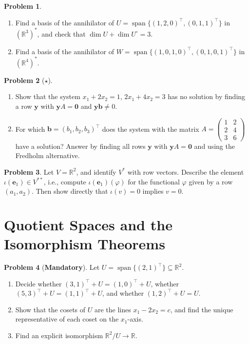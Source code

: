 \documentclass[11pt]{article}
\theoremstyle{definition}
\newtheorem{problem}{Problem}[section]
\newcommand{\mandatory}{\textcolor{red!70!black}{\textbf{Mandatory}}}
\DeclareMathOperator{\Span}{span}
\begin{document}
\begin{problem}\label{pr:annihilator}
    \begin{enumerate}[label=(\alph*)]
        \item Find a basis of the annihilator of $U = \Span\{(1, 2, 0)^\top, (0, 1, 1)^\top\}$ in $(\mathbb{R}^3)^*$, and check that $\dim U + \dim U^\circ = 3$.
        \item Find a basis of the annihilator of $W = \Span\{(1, 0, 1, 0)^\top, (0, 1, 0, 1)^\top\}$ in $(\mathbb{R}^4)^*$.
    \end{enumerate}
\end{problem}

\begin{problem}[$\star$]\label{pr:certificate}
    \begin{enumerate}[label=(\alph*)]
        \item Show that the system $x_1 + 2x_2 = 1$, $2x_1 + 4x_2 = 3$ has no solution by finding a row $\mathbf{y}$ with $\mathbf{y}A = \mathbf{0}$ and $\mathbf{y}\mathbf{b} \neq 0$.
        \item For which $\mathbf{b} = (b_1, b_2, b_3)^\top$ does the system with the matrix $A = \begin{pmatrix} 1 & 2 \\ 2 & 4 \\ 3 & 6 \end{pmatrix}$ have a solution? Answer by finding all rows $\mathbf{y}$ with $\mathbf{y}A = \mathbf{0}$ and using the Fredholm alternative.
    \end{enumerate}
\end{problem}

\begin{problem}\label{pr:double-dual}
    Let $V = \mathbb{R}^2$, and identify $V^*$ with row vectors. Describe the element $\iota(\mathbf{e}_1) \in V^{**}$, i.e., compute $\iota(\mathbf{e}_1)(\varphi)$ for the functional $\varphi$ given by a row $(a_1, a_2)$. Then show directly that $\iota(v) = 0$ implies $v = 0$.
\end{problem}

\section{Quotient Spaces and the Isomorphism Theorems}

\begin{problem}[\mandatory]\label{pr:cosets}
    Let $U = \Span\{(2, 1)^\top\} \subseteq \mathbb{R}^2$.
    \begin{enumerate}[label=(\alph*)]
        \item Decide whether $(3, 1)^\top + U = (1, 0)^\top + U$, whether $(5, 3)^\top + U = (1, 1)^\top + U$, and whether $(1, 2)^\top + U = U$.
        \item Show that the cosets of $U$ are the lines $x_1 - 2x_2 = c$, and find the unique representative of each coset on the $x_1$-axis.
        \item Find an explicit isomorphism $\mathbb{R}^2/U \to \mathbb{R}$.
    \end{enumerate}
\end{problem}
\end{document}
